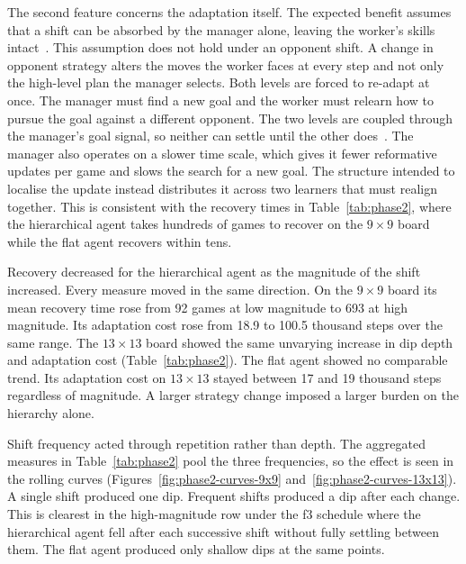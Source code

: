 \documentclass[sigconf,nonacm]{acmart}
\begin{document}
The second feature concerns the adaptation itself. The expected benefit assumes that a shift can be absorbed by the manager alone, leaving the worker's skills intact~\cite{vezhnevets2017feudal}. This assumption does not hold under an opponent shift. A change in opponent strategy alters the moves the worker faces at every step and not only the high-level plan the manager selects. Both levels are forced to re-adapt at once. The manager must find a new goal and the worker must relearn how to pursue the goal against a different opponent. The two levels are coupled through the manager's goal signal, so neither can settle until the other does~\cite{dayan1993feudal}. The manager also operates on a slower time scale, which gives it fewer reformative updates per game and slows the search for a new goal. The structure intended to localise the update instead distributes it across two learners that must realign together. This is consistent with the recovery times in Table~\ref{tab:phase2}, where the hierarchical agent takes hundreds of games to recover on the $9\times9$ board while the flat agent recovers within tens.

\medskip

Recovery decreased for the hierarchical agent as the magnitude of the shift increased. Every measure moved in the same direction. On the $9\times9$ board its mean recovery time rose from 92 games at low magnitude to 693 at high magnitude. Its adaptation cost rose from 18.9 to 100.5 thousand steps over the same range. The $13\times13$ board showed the same unvarying increase in dip depth and adaptation cost (Table~\ref{tab:phase2}). The flat agent showed no comparable trend. Its adaptation cost on $13\times13$ stayed between 17 and 19 thousand steps regardless of magnitude. A larger strategy change imposed a larger burden on the hierarchy alone.

Shift frequency acted through repetition rather than depth. The aggregated measures in Table~\ref{tab:phase2} pool the three frequencies, so the effect is seen in the rolling curves (Figures~\ref{fig:phase2-curves-9x9} and~\ref{fig:phase2-curves-13x13}). A single shift produced one dip. Frequent shifts produced a dip after each change. This is clearest in the high-magnitude row under the f3 schedule where the hierarchical agent fell after each successive shift without fully settling between them. The flat agent produced only shallow dips at the same points.
\end{document}
